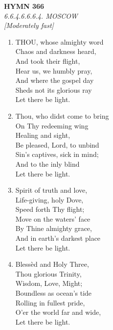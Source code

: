 \documentclass[11pt,a4paper]{article}
\begin{document}
\newpage
\begin{center}
    {\Large \textbf{HYMN 366}}
    \\
    \textit{6.6.4.6.6.6.4. MOSCOW}
    \\
    \textit{\small [Moderately fast]}
\end{center}
\vspace{1em}

\begin{enumerate}
    \item THOU, whose almighty word \\
        Chaos and darkness heard, \\
        And took their flight, \\
        Hear us, we humbly pray, \\
        And where the gospel day \\
        Sheds not its glorious ray \\
        Let there be light.

    \item Thou, who didst come to bring \\
        On Thy redeeming wing \\
        Healing and sight, \\
        Be pleased, Lord, to unbind \\
        Sin's captives, sick in mind; \\
        And to the inly blind \\
        Let there be light.

    \item Spirit of truth and love, \\
        Life-giving, holy Dove, \\
        Speed forth Thy flight; \\
        Move on the waters' face \\
        By Thine almighty grace, \\
        And in earth's darkest place \\
        Let there be light.

    \item Bless\`ed and Holy Three, \\
        Thou glorious Trinity, \\
        Wisdom, Love, Might; \\
        Boundless as ocean's tide \\
        Rolling in fullest pride, \\
        O'er the world far and wide, \\
        Let there be light.

\end{enumerate}
\end{document}
